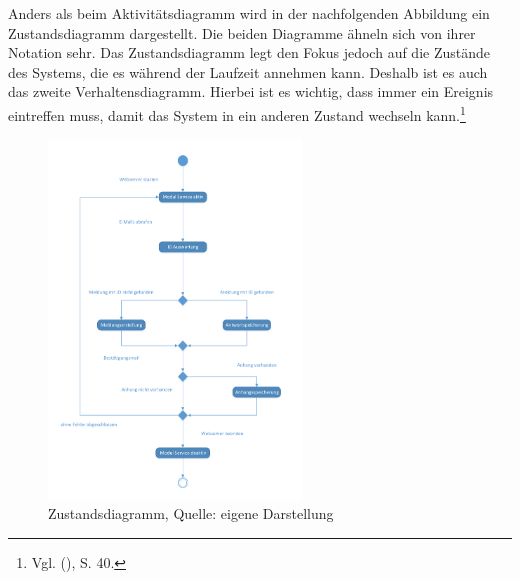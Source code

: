 \noindent
Anders als beim Aktivitätsdiagramm wird in der nachfolgenden Abbildung ein Zustandsdiagramm dargestellt. Die beiden Diagramme ähneln sich von ihrer Notation sehr. Das Zustandsdiagramm legt den Fokus jedoch auf die Zustände des Systems, die es während der Laufzeit annehmen kann. Deshalb ist es auch das zweite Verhaltensdiagramm. Hierbei ist es wichtig, dass immer ein Ereignis eintreffen muss, damit das System in ein anderen Zustand wechseln kann.\footnote{Vgl. \citeauthor{Balzert} (\citeyear{Balzert}), S. 40.}

\begin{figure}[h!]
\centering
\includegraphics[width=0.6\textwidth]{Abbildungen/Zustandsdiagramm.pdf}
	\caption[Zustandsdiagramm]{Zustandsdiagramm, Quelle: eigene Darstellung}
	\label{fig:Zustandsdiagramm}
\end{figure}

